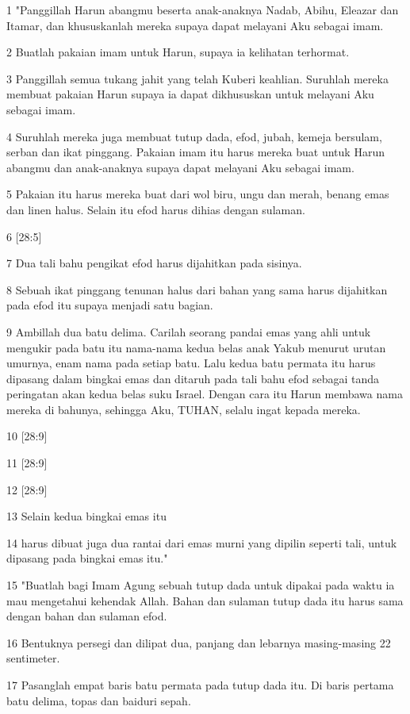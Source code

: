 \par 1 "Panggillah Harun abangmu beserta anak-anaknya Nadab, Abihu, Eleazar dan Itamar, dan khususkanlah mereka supaya dapat melayani Aku sebagai imam.
\par 2 Buatlah pakaian imam untuk Harun, supaya ia kelihatan terhormat.
\par 3 Panggillah semua tukang jahit yang telah Kuberi keahlian. Suruhlah mereka membuat pakaian Harun supaya ia dapat dikhususkan untuk melayani Aku sebagai imam.
\par 4 Suruhlah mereka juga membuat tutup dada, efod, jubah, kemeja bersulam, serban dan ikat pinggang. Pakaian imam itu harus mereka buat untuk Harun abangmu dan anak-anaknya supaya dapat melayani Aku sebagai imam.
\par 5 Pakaian itu harus mereka buat dari wol biru, ungu dan merah, benang emas dan linen halus. Selain itu efod harus dihias dengan sulaman.
\par 6 [28:5]
\par 7 Dua tali bahu pengikat efod harus dijahitkan pada sisinya.
\par 8 Sebuah ikat pinggang tenunan halus dari bahan yang sama harus dijahitkan pada efod itu supaya menjadi satu bagian.
\par 9 Ambillah dua batu delima. Carilah seorang pandai emas yang ahli untuk mengukir pada batu itu nama-nama kedua belas anak Yakub menurut urutan umurnya, enam nama pada setiap batu. Lalu kedua batu permata itu harus dipasang dalam bingkai emas dan ditaruh pada tali bahu efod sebagai tanda peringatan akan kedua belas suku Israel. Dengan cara itu Harun membawa nama mereka di bahunya, sehingga Aku, TUHAN, selalu ingat kepada mereka.
\par 10 [28:9]
\par 11 [28:9]
\par 12 [28:9]
\par 13 Selain kedua bingkai emas itu
\par 14 harus dibuat juga dua rantai dari emas murni yang dipilin seperti tali, untuk dipasang pada bingkai emas itu."
\par 15 "Buatlah bagi Imam Agung sebuah tutup dada untuk dipakai pada waktu ia mau mengetahui kehendak Allah. Bahan dan sulaman tutup dada itu harus sama dengan bahan dan sulaman efod.
\par 16 Bentuknya persegi dan dilipat dua, panjang dan lebarnya masing-masing 22 sentimeter.
\par 17 Pasanglah empat baris batu permata pada tutup dada itu. Di baris pertama batu delima, topas dan baiduri sepah.
